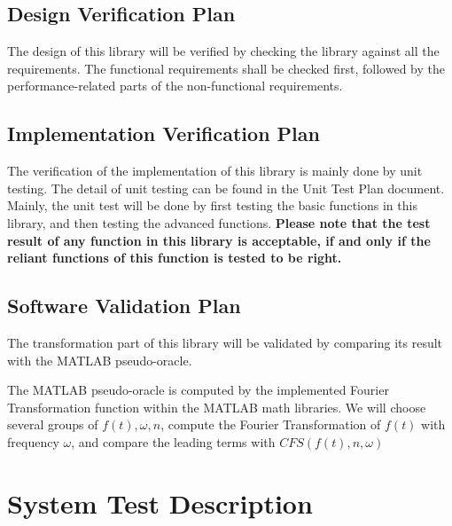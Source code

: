 \documentclass[12pt, titlepage]{article}
\begin{document}
\subsection{Design Verification Plan}
\label{sbsc:DesignVnVPlan}

The design of this library will be verified by checking the library against all the requirements. The functional requirements shall be checked first, followed by the performance-related parts of the non-functional requirements. 

\subsection{Implementation Verification Plan}
\label{sbsc:ImplementationVnVPlan}

The verification of the implementation of this library is mainly done by unit
testing. The detail of unit testing can be found in the Unit Test Plan
document. Mainly, the unit test will be done by first testing the basic
functions in this library, and then testing the advanced functions. \textbf{Please note
that the test result of any function in this library is acceptable, if and only
if the reliant functions of this function is tested to be right.}

\subsection{Software Validation Plan}\label{sbsc:SoftwareVnVPlan}

The transformation part of this library will be validated by comparing its
result with the MATLAB pseudo-oracle. 

The MATLAB pseudo-oracle is computed by the implemented Fourier Transformation function within the MATLAB math libraries. We will choose several groups of $f(t), \omega, n$, compute the Fourier Transformation of $f(t)$ with frequency $\omega$, and compare the leading terms with $\mathit{CFS}(f(t), n, \omega)$  

\section{System Test Description}
	
\end{document}
